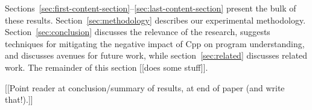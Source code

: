 \documentclass[10pt]{article}
\def\numpackages{30}
\begin{document}
Sections~\ref{sec:first-content-section}--\ref{sec:last-content-section}
present the bulk of these results.  Section~\ref{sec:methodology} describes
our experimental methodology.  Section~\ref{sec:conclusion} discusses the relevance of the research,
suggests techniques for mitigating the negative impact of Cpp on program
understanding, and discusses avenues for future work, while
section~\ref{sec:related} discusses related work.
The remainder of this section [[does some stuff]].

[[Point reader at conclusion/summary of results, at end of paper (and write
that!).]]

% 
% 
% 
% 
% 
\end{document}
